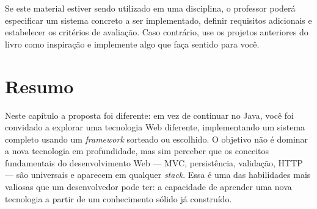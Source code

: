 Se este material estiver sendo utilizado em uma disciplina, o professor poderá especificar um sistema concreto a ser implementado, definir requisitos adicionais e estabelecer os critérios de avaliação. Caso contrário, use os projetos anteriores do livro como inspiração e implemente algo que faça sentido para você.


\section{Resumo}

Neste capítulo a proposta foi diferente: em vez de continuar no Java, você foi convidado a explorar uma tecnologia Web diferente, implementando um sistema completo usando um \textit{framework} sorteado ou escolhido. O objetivo não é dominar a nova tecnologia em profundidade, mas sim perceber que os conceitos fundamentais do desenvolvimento Web --- MVC, persistência, validação, HTTP --- são universais e aparecem em qualquer \textit{stack}. Essa é uma das habilidades mais valiosas que um desenvolvedor pode ter: a capacidade de aprender uma nova tecnologia a partir de um conhecimento sólido já construído.

